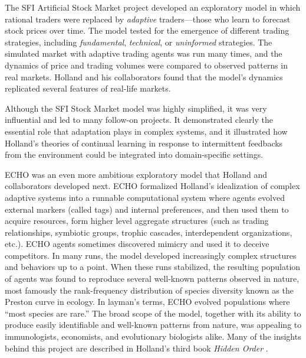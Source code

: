 \documentclass{sig-alternate}
\begin{document}
The SFI Artificial Stock Market project \cite{Arthur1997,Palmer1994}
developed an exploratory model in which rational
traders were replaced by \emph{adaptive} traders---those who learn to
forecast stock prices over time.  The model tested for the
emergence of different trading strategies, including
\emph{fundamental}, \emph{technical}, or \emph{uninformed}
strategies. The simulated market with adaptive trading agents was run
many times, and the dynamics of price and trading volumes were
compared to observed patterns in real markets.  Holland and his
collaborators found that the model's dynamics replicated several
features of real-life markets.

Although the SFI Stock Market model was highly simplified, it was very
influential and led to many follow-on projects.  It 
demonstrated clearly the essential role that adaptation plays in complex
systems, and it illustrated how Holland's theories of continual learning
in response to intermittent feedbacks from the environment could be
integrated into domain-specific settings.

ECHO \cite{Holland1999,Hraber1997} was an even more ambitious exploratory model
that Holland and collaborators developed next. 
ECHO formalized Holland's idealization of complex adaptive systems into
a runnable computational system where agents evolved external markers
(called tags) and internal preferences, and then used them to acquire
resources, form higher
level aggregate structures (such as trading relationships, symbiotic groups,
trophic cascades, interdependent organizations, etc.).  ECHO agents
sometimes discovered mimicry and used it to deceive competitors.  
In many runs,  
the model developed increasingly complex structures and behaviors up
to a point.  When these runs stabilized, the resulting population of agents
was found to reproduce several well-known patterns 
observed in nature, most famously the rank-frequency distribution of
species diversity known as the Preston curve in ecology.
In layman's terms, ECHO evolved populations where 
``most species are rare.''  
The broad scope of the model, together with its ability to produce
easily identifiable and well-known patterns from nature, was appealing to immunologists, economists, and evolutionary biologists alike.   Many
of the insights behind this project are described in Holland's third book \emph{Hidden Order} \cite{Holland1995}. 
\end{document}

